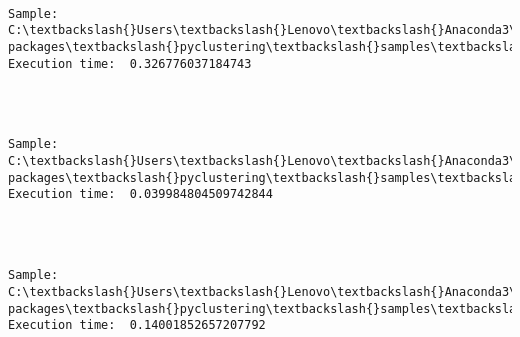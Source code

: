 \documentclass[11pt]{article}
\begin{document}
    \begin{center}
    \end{center}
    { \hspace*{\fill} \\}
    
    \begin{Verbatim}[commandchars=\\\{\}]
Sample:  C:\textbackslash{}Users\textbackslash{}Lenovo\textbackslash{}Anaconda3\textbackslash{}lib\textbackslash{}site-packages\textbackslash{}pyclustering\textbackslash{}samples\textbackslash{}samples\textbackslash{}fcps\textbackslash{}Atom.data 		Execution time:  0.326776037184743 


    \end{Verbatim}

    \begin{center}
    \end{center}
    { \hspace*{\fill} \\}
    
    \begin{Verbatim}[commandchars=\\\{\}]
Sample:  C:\textbackslash{}Users\textbackslash{}Lenovo\textbackslash{}Anaconda3\textbackslash{}lib\textbackslash{}site-packages\textbackslash{}pyclustering\textbackslash{}samples\textbackslash{}samples\textbackslash{}fcps\textbackslash{}Lsun.data 		Execution time:  0.039984804509742844 


    \end{Verbatim}

    \begin{center}
    \end{center}
    { \hspace*{\fill} \\}
    
    \begin{Verbatim}[commandchars=\\\{\}]
Sample:  C:\textbackslash{}Users\textbackslash{}Lenovo\textbackslash{}Anaconda3\textbackslash{}lib\textbackslash{}site-packages\textbackslash{}pyclustering\textbackslash{}samples\textbackslash{}samples\textbackslash{}fcps\textbackslash{}Target.data 		Execution time:  0.14001852657207792 


    \end{Verbatim}
\end{document}
